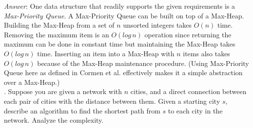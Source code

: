 \documentclass{scrartcl}
\begin{document}
    \noindent
    \textit{Answer}: One data structure that readily supports the given requirements is a
    \emph{Max-Priority Queue}. A Max-Priority Queue can be built on top of a Max-Heap. Building the
    Max-Heap from a set of $n$ unsorted integers takes $O(n)$ time. Removing the maximum item is an
    $O(log\,n)$ operation since returning the maximum can be done in constant time but maintaining
    the Max-Heap takes $O(log\,n)$ time. Inserting an item into a Max-Heap with $n$ items also takes
    $O(log\,n)$ because of the Max-Heap maintenance procedure. (Using Max-Priority Queue here as
    defined in Cormen et al. effectively makes it a simple abstraction over a Max-Heap.)\\

    \bigskip
    . Suppose you are given a network with $n$ cities, and a direct connection between each pair of
    cities with the distance between them. Given a starting city $s$, describe an algorithm to find
    the shortest path from $s$ to each city in the network. Analyze the complexity.\\
\end{document}
